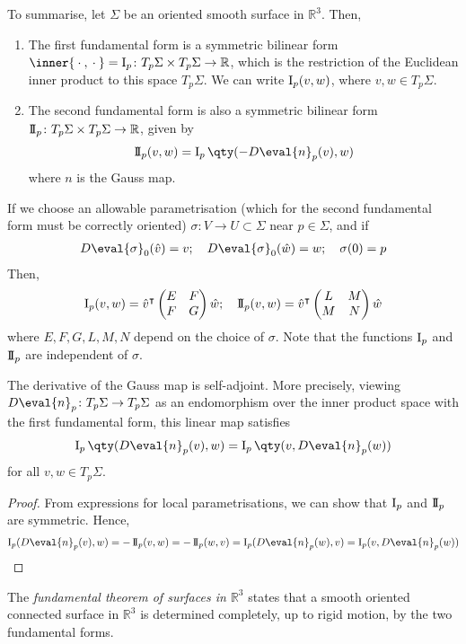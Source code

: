 \begin{remark}
	To summarise, let $\Sigma$ be an oriented smooth surface in $\mathbb R^3$.
	Then,
	\begin{enumerate}
		\item The first fundamental form is a symmetric bilinear form $\inner{\wildcard,\wildcard} = \Iff_p \colon T_p \Sigma \times T_p \Sigma \to \mathbb R$, which is the restriction of the Euclidean inner product to this space $T_p \Sigma$.
		      We can write $\operatorname{\mathrm{I}}_p(v,w)$, where $v, w \in T_p \Sigma$.
		\item The second fundamental form is also a symmetric bilinear form $\operatorname{\mathrm{I\!I}}_p \colon T_p \Sigma \times T_p \Sigma \to \mathbb R$, given by
		      \begin{align*}
			      \IIff_p(v,w) = \Iff_p\qty(-D\eval{n}_p(v), w)
		      \end{align*}
		      where $n$ is the Gauss map.
	\end{enumerate}
	If we choose an allowable parametrisation (which for the second fundamental form must be correctly oriented) $\sigma \colon V \to U \subset \Sigma$ near $p \in \Sigma$, and if
	\begin{align*}
		D \eval{\sigma}_0(\hat v) = v;\quad D \eval{\sigma}_0(\hat w) = w;\quad \sigma(0) = p
	\end{align*}
	Then,
	\begin{align*}
		\operatorname{\mathrm{I}}_p(v,w) = {\hat v}^\intercal \begin{pmatrix}
			E & F \\
			F & G
		\end{pmatrix} \hat w;\quad \operatorname{\mathrm{I\!I}}_p(v,w) = {\hat v}^\intercal \begin{pmatrix}
			L & M \\
			M & N
		\end{pmatrix} \hat w
	\end{align*}
	where $E, F, G, L, M, N$ depend on the choice of $\sigma$.
	Note that the functions $\operatorname{\mathrm{I}}_p$ and $\operatorname{\mathrm{I\!I}}_p$ are independent of $\sigma$.
\end{remark}
\begin{lemma}
	The derivative of the Gauss map is self-adjoint.
	More precisely, viewing $D \eval{n}_p \colon T_p \Sigma \to T_p \Sigma$ as an endomorphism over the inner product space with the first fundamental form, this linear map satisfies
	\begin{align*}
		\Iff_p\qty(D \eval{n}_p(v), w) = \Iff_p\qty(v, D \eval{n}_p(w))
	\end{align*}
	for all $v, w \in T_p \Sigma$.
\end{lemma}
\begin{proof}
	From expressions for local parametrisations, we can show that $\operatorname{\mathrm{I}}_p$ and $\operatorname{\mathrm{I\!I}}_p$ are symmetric.
	Hence,
	\begin{align*}
		\Iff_p(D\eval{n}_p(v),w) = -\IIff_p(v,w) = -\IIff_p(w,v) = \Iff_p(D \eval{n}_p(w),v) = \Iff_p(v,D\eval{n}_p(w))
	\end{align*}
\end{proof}
\begin{remark}
	The \textit{fundamental theorem of surfaces in $\mathbb R^3$} states that a smooth oriented connected surface in $\mathbb R^3$ is determined completely, up to rigid motion, by the two fundamental forms.
\end{remark}

